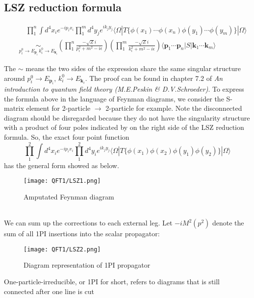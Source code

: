 \subsection{LSZ reduction formula}
\begin{newthem}
\begin{eqnarray}
&& \quad \prod_1^n \int d^4 x_i e^{-ip_ix_i} \prod_1^m d^4 y_j e^{ik_jy_j} \langle \Omega | T \{\phi(x_1) \cdots \phi(x_n) \phi(y_1) \cdots \phi(y_m)\} | \Omega \rangle \nonumber \\
&& \underset{ p_i^0 \to E_{\bm{p}_i}\, k_i^0 \to E_{\bm{k}_i}}{\sim}  \left( \prod_1^n \frac{-\sqrt{Z} i}{p_i^2 + m^2 -i\epsilon} \right) \left( \prod_1^m \frac{-\sqrt{Z} i}{k_i^2 + m^2 -i\epsilon} \right) \langle \bm{p}_1 \cdots \bm{p}_n | S | \bm{k}_1 \cdots \bm{k}_m \rangle \nonumber
\end{eqnarray}
\end{newthem}
\noindent
The $\sim$ means the two sides of the expression share the same singular structure around $p_i^0 \to E_{\bm{p}_i}$, $k_i^0 \to E_{\bm{k}_i}$.
The proof can be found in chapter 7.2 of \emph{An introduction to quantum field theory (M.E.Peskin \& D.V.Schroeder)}.
To express the formula above in the language of Feynman diagrams, we consider the S-matrix element for 2-particle $\to$ 2-particle for example. Note the disconnected diagram should be disregarded because they do not have the singularity structure with a product of four poles indicated by on the right side of the LSZ reduction formula. So, the exact four point function
\[\prod_1^2 \int d^4 x_i e^{-ip_ix_i} \prod_1^2 d^4 y_i e^{ik_jy_j} \langle \Omega | T \{\phi(x_1)\phi(x_2)\phi(y_1) \phi(y_2)\} | \Omega \rangle \]
has the general form showed as below.
\begin{figure}[!h]
\centering
\texttt{[image: QFT1/LSZ1.png]}
\caption{Amputated Feynman diagram}
\end{figure}\\
We can sum up the corrections to each external leg. Let $-iM^2(p^2)$ denote the sum of all 1PI insertions into the scalar propagator:
\begin{figure}[!h]
\centering
\texttt{[image: QFT1/LSZ2.png]}
\caption{Diagram representation of 1PI propagator}
\end{figure}
\begin{note}
One-particle-irreducible, or 1PI for short, refers to diagrams that is still connected after one line is cut
\end{note}
